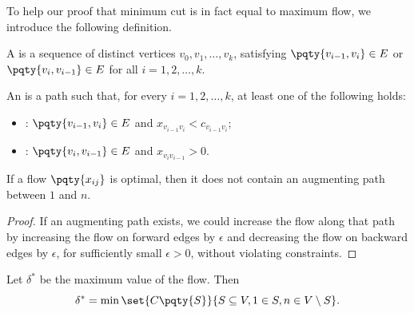 To help our proof that minimum cut is in fact equal to maximum flow, we introduce the following definition.

\begin{definition}
    A  is a sequence of distinct vertices \(v_0, v_1, \ldots, v_k\), satisfying \(\pqty{v_{i - 1}, v_i} \in E\) or \(\pqty{v_i, v_{i - 1}} \in E\) for all \(i = 1, 2, \ldots, k\).

    An  is a path such that, for every \(i = 1, 2, \ldots, k\), at least one of the following holds:
    \begin{itemize}
        \item {}: \(\pqty{v_{i - 1}, v_i} \in E\) and \(x_{v_{i - 1} v_i} < c_{v_{i - 1} v_i}\);
        \item {}: \(\pqty{v_i, v_{i - 1}} \in E\) and \(x_{v_i v_{i - 1}} > 0\).
    \end{itemize}
\end{definition}

\begin{lemma}
    If a flow \(\pqty{x_{ij}}\) is optimal, then it does not contain an augmenting path between \(1\) and \(n\).
\end{lemma}

\begin{proof}
    If an augmenting path exists, we could increase the flow along that path by increasing the flow on forward edges by \(\epsilon\) and decreasing the flow on backward edges by \(\epsilon\), for sufficiently small \(\epsilon > 0\), without violating constraints.
\end{proof}

\begin{theorem}
    \label{thm:max-flow-min-cut}%
    Let \(\delta^{\ast}\) be the maximum value of the flow. Then
    \[
        \delta^{\ast} = \min \set{C \pqty{S}}{S \subseteq V, 1 \in S, n \in V \setminus S}.
    \]
\end{theorem}

